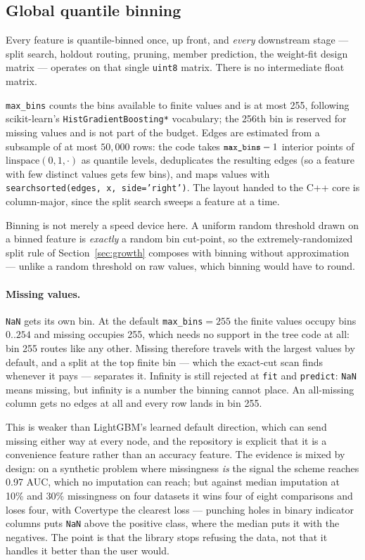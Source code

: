 \documentclass[11pt,a4paper]{article}
\newcommand{\code}[1]{\texttt{\small #1}}
\theoremstyle{definition}
\begin{document}
\subsection{Global quantile binning}\label{sec:binning}

Every feature is quantile-binned once, up front, and \emph{every} downstream
stage --- split search, holdout routing, pruning, member prediction, the
weight-fit design matrix --- operates on that single \code{uint8} matrix. There
is no intermediate float matrix.

\code{max\_bins} counts the bins available to finite values and is at most 255,
following scikit-learn's \code{HistGradientBoosting*} vocabulary; the 256th bin
is reserved for missing values and is not part of the budget. Edges are
estimated from a subsample of at most $50{,}000$ rows: the code takes
$\code{max\_bins}-1$ interior points of $\text{linspace}(0,1,\cdot)$ as quantile
levels, deduplicates the resulting edges (so a feature with few distinct values
gets few bins), and maps values with
\code{searchsorted(edges, x, side='right')}. The layout handed to the C++ core
is column-major, since the split search sweeps a feature at a time.

Binning is not merely a speed device here. A uniform random threshold drawn on
a binned feature is \emph{exactly} a random bin cut-point, so the
extremely-randomized split rule of Section~\ref{sec:growth} composes with
binning without approximation --- unlike a random threshold on raw values,
which binning would have to round.

\paragraph{Missing values.} \code{NaN} gets its own bin. At the default
\code{max\_bins}$=255$ the finite values occupy bins $0..254$ and missing
occupies 255, which needs no support in the tree code at all: bin 255 routes
like any other. Missing therefore travels with the largest values by default,
and a split at the top finite bin --- which the exact-cut scan finds whenever it
pays --- separates it. Infinity is still rejected at
\code{fit} and \code{predict}: \code{NaN} means missing, but infinity is a
number the binning cannot place. An all-missing column gets no edges at all and
every row lands in bin 255.

This is weaker than LightGBM's learned default direction, which can send missing
either way at every node, and the repository is explicit that it is a
convenience feature rather than an accuracy feature. The evidence is mixed by
design: on a synthetic problem where missingness \emph{is} the signal the scheme
reaches 0.97 AUC, which no imputation can reach; but against median imputation
at 10\% and 30\% missingness on four datasets it wins four of eight comparisons
and loses four, with Covertype the clearest loss --- punching holes in binary
indicator columns puts \code{NaN} above the positive class, where the median
puts it with the negatives. The point is that the library stops refusing the
data, not that it handles it better than the user would.
\end{document}
